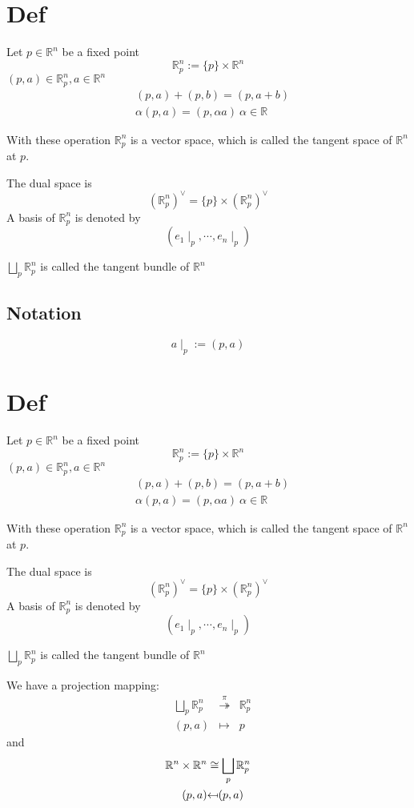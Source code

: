 \documentclass{article}
\begin{document}
\section{Def}

Let $p\in \mathbb{R}^n$ be a fixed point
$$\mathbb{R}^n_p:=\{p\}\times\mathbb{R}^n$$
$(p,a)\in \mathbb{R}^n_p,a\in \mathbb{R}^n$
$$\begin{aligned}
    &(p,a)+(p,b)=(p,a+b)\\ &\alpha(p,a)=(p,\alpha a)\  \alpha\in \mathbb{R}
\end{aligned}$$

With these operation $\mathbb{R}^n_p$ is a vector space, which is called the tangent space of $\mathbb{R}^n$ at $p$.

The dual space is $$(\mathbb{R}^n_p)^\vee=\{p\}\times(\mathbb{R}_p^n)^\vee$$
A basis of $\mathbb{R}_p^n$ is denoted by $$(e_1\mid_p,\cdots,e_n\mid_p)$$

$\bigsqcup\limits_p \mathbb{R}^n_p$ is called the tangent bundle of $\mathbb{R}^n$
\subsection{Notation}
$$a\mid_p:=(p,a)$$
\section{Def}

Let $p\in \mathbb{R}^n$ be a fixed point
$$\mathbb{R}^n_p:=\{p\}\times\mathbb{R}^n$$
$(p,a)\in \mathbb{R}^n_p,a\in \mathbb{R}^n$
$$\begin{aligned}
    &(p,a)+(p,b)=(p,a+b)\\ &\alpha(p,a)=(p,\alpha a)\  \alpha\in \mathbb{R}
\end{aligned}$$

With these operation $\mathbb{R}^n_p$ is a vector space, which is called the tangent space of $\mathbb{R}^n$ at $p$.

The dual space is $$(\mathbb{R}^n_p)^\vee=\{p\}\times(\mathbb{R}_p^n)^\vee$$
A basis of $\mathbb{R}_p^n$ is denoted by $$(e_1\mid_p,\cdots,e_n\mid_p)$$

$\bigsqcup\limits_p \mathbb{R}^n_p$ is called the tangent bundle of $\mathbb{R}^n$

We have a projection mapping:
$$ 
\begin{aligned}
    &\bigsqcup \limits_{p}\mathbb{R}^n_p&\stackrel{\pi}{\twoheadrightarrow}&\mathbb{R}^n_p\\ &(p,a)&\mapsto &p
\end{aligned}$$
and 
$$
\begin{aligned}
    \mathbb{R}^n\times\mathbb{R}^n &\cong \bigsqcup \limits_{p}\mathbb{R}^n_p\\ (p,a) &\reflectbox{\ensuremath{\mapsto}} (p,a)
\end{aligned}
$$
\end{document}
